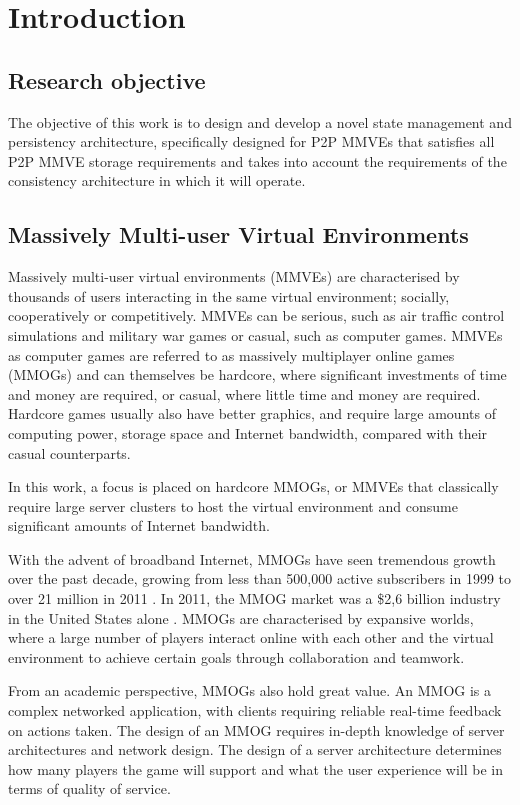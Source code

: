\chapter{Introduction}
\label{chp:INTRO}

\section{Research objective}

The objective of this work is to design and develop a novel state management and persistency architecture, specifically designed for P2P MMVEs that satisfies all P2P MMVE storage requirements and takes into account the requirements of the consistency architecture in which it will operate.

\section{Massively Multi-user Virtual Environments}

Massively multi-user virtual environments (MMVEs) are characterised by thousands of users interacting in the same virtual environment; socially, cooperatively or competitively. MMVEs can be serious, such as air traffic control simulations and military war games or casual, such as computer games. MMVEs as computer games are referred to as massively multiplayer online games (MMOGs) and can themselves be hardcore, where significant investments of time and money are required, or casual, where little time and money are required. Hardcore games usually also have better graphics, and require large amounts of computing power, storage space and Internet bandwidth, compared with their casual counterparts.

In this work, a focus is placed on hardcore MMOGs, or MMVEs that classically require large server clusters to host the virtual environment and consume significant amounts of Internet bandwidth.

With the advent of broadband Internet, MMOGs have seen tremendous growth over the past decade, growing from less than 500,000 active subscribers in 1999 to over 21 million in 2011 \cite{mmo_growth_chart}. In 2011, the MMOG market was a \$2,6 billion industry in the United States alone \cite{newzoo_mmo_report}. MMOGs are characterised by expansive worlds, where a large number of players interact online with each other and the virtual environment to achieve certain goals through collaboration and teamwork.

From an academic perspective, MMOGs also hold great value. An MMOG is a complex networked application, with clients requiring reliable real-time feedback on actions taken. The design of an MMOG requires in-depth knowledge of server architectures and network design. The design of a server architecture determines how many players the game will support and what the user experience will be in terms of quality of service.

